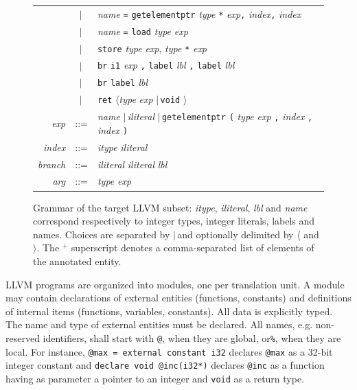 \documentclass{llncs}
\newcommand{\llvm}[1]{\texttt{#1}}
\newcommand{\lalt}[0]{$\langle$\xspace}
\newcommand{\ralt}[0]{$\rangle$\xspace}
\newcommand{\alt}[0]{$\mid\,$}
\newcommand{\ListOf}[1]{$\mbox{#1}^+$}
\newcommand{\nt}[1]{{\normalfont\textit{#1}}}
\begin{document}
\begin{figure}
\begin{center}
\begin{tabular}{rcl}
      & \alt & \nt{name} \llvm{=} \llvm{getelementptr} \nt{type} \llvm{*} \nt{exp}\llvm{,} \nt{index}\llvm{,} \nt{index} \\
      & \alt & \nt{name} \llvm{=} \llvm{load} \nt{type} \nt{exp} \\
      & \alt & \llvm{store} \nt{type} \nt{exp}, \nt{type} \llvm{*} \nt{exp} \\
      & \alt & \llvm{br} \llvm{i1} \nt{exp} \llvm{,} \llvm{label} \nt{lbl} \llvm{,} \llvm{label} \nt{lbl} \\
      & \alt & \llvm{br} \llvm{label} \nt{lbl} \\
      & \alt & \llvm{ret} \lalt \nt{type} \nt{exp} \alt \llvm{void} \ralt \\
      \nt{exp} & ::= & \nt{name} \alt \nt{iliteral} \alt \llvm{getelementptr} \llvm{(} \nt{type} \nt{exp} \llvm{,} \nt{index} \llvm{,} \nt{index} \llvm{)} \\
      \nt{index} & ::= & \nt{itype} \nt{iliteral} \\
      \nt{branch} & ::= & \nt{iliteral} \nt{iliteral} \nt{lbl} \\
      \nt{arg} & ::= & \nt{type} \nt{exp}
    \end{tabular}
  \end{center}
  \caption{Grammar of the target LLVM subset: \nt{itype}, \nt{iliteral}, \nt{lbl}
    and \nt{name} correspond respectively to integer types, integer literals,
    labels and names. Choices are separated by \alt and optionally delimited by
    \lalt and \ralt.  The \ListOf{} superscript denotes a comma-separated list of
    elements of the annotated entity.}
  \label{fig:llvm-grammar}
\end{figure}

LLVM programs are organized into modules, one per translation unit. A module may
contain declarations of external entities (functions, constants) and definitions
of internal items (functions, variables, constants). All data is explicitly
typed. The name and type of external entities must be declared.  All names,
e.g. non-reserved identifiers, shall start with \llvm{@}, when they are global,
or\llvm{\%}, when they are local. For instance, \llvm{@max = external constant
  i32} declares \llvm{@max} as a 32-bit integer constant and \llvm{declare void
  @inc(i32*)} declares \llvm{@inc} as a function having as parameter a pointer
to an integer and \llvm{void} as a return type.
\end{document}
